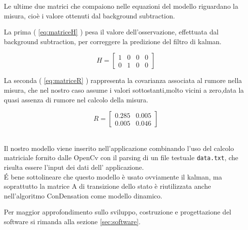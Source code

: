 

Le ultime due matrici che compaiono nelle equazioni del modello riguardano la misura, cioè i valore ottenuti dal background subtraction. 

La prima ( \ref{eq:matriceH} ) pesa il valore dell'osservazione, effettuata dal background subtraction, per correggere la predizione del filtro di kalman.

\begin{equation} \label{eq:matriceH}
 H = \begin{bmatrix} 
1 & 0 & 0 & 0\\
0 & 1 & 0 & 0
\end{bmatrix}
\end{equation}


La seconda ( \ref{eq:matriceR} ) rappresenta la covarianza associata al rumore nella misura, che nel nostro caso assume i valori sottostanti,molto vicini a zero,data la quasi assenza di rumore nel calcolo della misura.


\begin{equation}\label{eq:matriceR}
 R = \begin{bmatrix} 
0.285 & 0.005\\
0.005 & 0.046
\end{bmatrix} 
\end{equation}

~\\
Il nostro modello viene inserito nell'applicazione combinando l'uso del calcolo matriciale fornito dalle OpenCv con il parsing di un file testuale \texttt{data.txt}, che risulta essere l'input dei dati dell' applicazione.\\

\'E bene sottolineare che questo modello è usato ovviamente il kalman, ma soprattutto la matrice A di transizione dello stato è riutilizzata anche nell'algoritmo ConDensation come modello dinamico.


Per maggior approfondimento sullo sviluppo, costruzione e progettazione del software si rimanda alla sezione \ref{sec:software}.
